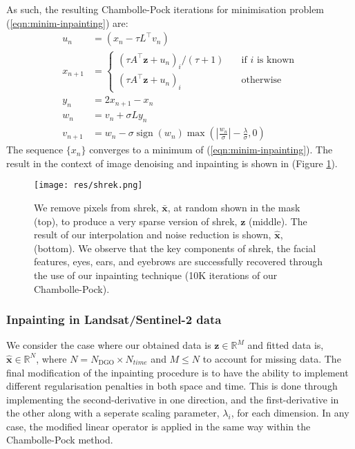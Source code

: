 \documentclass[12pt]{article}
\begin{document}
As such, the resulting Chambolle-Pock iterations for minimisation problem (\ref{eqn:minim-inpainting}) are:
\begin{align}
    u_n &= \left(x_{n} - \tau L^{\top} v_{n}\right) \\
    x_{n+1} &= \begin{cases}
        (\tau A^\top \bm{z} + u_n)_i/(\tau + 1) &\quad \mbox{if $i$ is known}\\
        (\tau A^\top \bm{z} + u_n)_i &\quad \mbox{otherwise} 
    \end{cases}\\
    y_{n} &= 2x_{n+1}-x_{n} \\
    w_{n} &= v_{n}+\sigma L y_{n} \\
    v_{n+1} &= w_{n} - \sigma \operatorname{sign}(w_n)\max{\left(\left|\frac{w_n}{\sigma}\right|-\frac{\lambda}{\sigma}, 0\right)}
\end{align}
The sequence $\{x_n\}$ converges to a minimum of (\ref{eqn:minim-inpainting}). The result in the context of image denoising and inpainting is shown in (Figure \ref{fig:shrek}).

\begin{figure}[H]
    \centering
    \texttt{[image: res/shrek.png]}
    \caption{We remove pixels from shrek, $\bm{\bar{x}}$, at random shown in the mask (top), to produce a very sparse version of shrek, $\bm{z}$ (middle). The result of our interpolation and noise reduction is shown, $\bm{\hat{x}}$, (bottom). We observe that the key components of shrek, the facial features, eyes, ears, and eyebrows are successfully recovered through the use of our inpainting technique (10K iterations of our Chambolle-Pock).}
    \label{fig:shrek}
\end{figure}


\subsubsection{Inpainting in Landsat/Sentinel-2 data}
We consider the case where our obtained data is $\bm{z} \in \mathbb{R}^M$ and fitted data is, $\bm{\hat{x}} \in \mathbb{R}^N$, where $N=N_{\text{DGO}}\times N_{time}$ and $M \leq N$ to account for missing data. The final modification of the inpainting procedure is to have the ability to implement different regularisation penalties in both space and time. This is done through implementing the second-derivative in one direction, and the first-derivative in the other along with a seperate scaling parameter, $\lambda_i$, for each dimension. In any case, the modified linear operator is applied in the same way within the Chambolle-Pock method.
\end{document}
